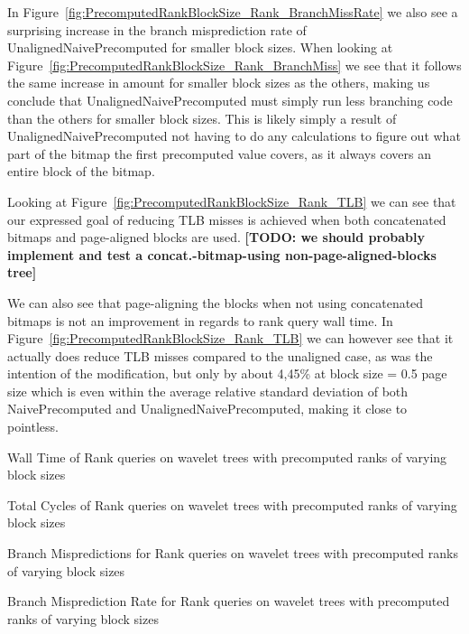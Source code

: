 In Figure~\ref{fig:PrecomputedRankBlockSize_Rank_BranchMissRate} we also see a surprising increase in the branch misprediction rate of UnalignedNaivePrecomputed for smaller block sizes.
When looking at Figure~\ref{fig:PrecomputedRankBlockSize_Rank_BranchMiss} we see that it follows the same increase in amount for smaller block sizes as the others, making us conclude that UnalignedNaivePrecomputed must simply run less branching code than the others for smaller block sizes.
This is likely simply a result of UnalignedNaivePrecomputed not having to do any calculations to figure out what part of the bitmap the first precomputed value covers, as it always covers an entire block of the bitmap.

Looking at Figure~\ref{fig:PrecomputedRankBlockSize_Rank_TLB} we can see that our expressed goal of reducing TLB misses is achieved when both concatenated bitmaps and page-aligned blocks are used. \textbf{[TODO: we should probably implement and test a concat.-bitmap-using non-page-aligned-blocks tree]}




We can also see that page-aligning the blocks when not using concatenated bitmaps is not an improvement in regards to rank query wall time.
In Figure~\ref{fig:PrecomputedRankBlockSize_Rank_TLB} we can however see that it actually does reduce TLB misses compared to the unaligned case, as was the intention of the modification, but only by about 4,45\% at block size = 0.5 page size which is even within the average relative standard deviation of both NaivePrecomputed and UnalignedNaivePrecomputed, making it close to pointless.



\figureBegin
\caption{Wall Time of Rank queries on wavelet trees with precomputed ranks of varying block sizes}
\label{fig:PrecomputedRankBlockSize_Rank_WallTime}

\figureEnd


\figureBegin
\caption{Total Cycles of Rank queries on wavelet trees with precomputed ranks of varying block sizes}
\label{fig:PrecomputedRankBlockSize_Rank_TotalCycles}

\figureEnd

\figureBegin
\caption{Branch Mispredictions for Rank queries on wavelet trees with precomputed ranks of varying block sizes}
\label{fig:PrecomputedRankBlockSize_Rank_BranchMiss}

\figureEnd


\figureBegin
\caption{Branch Misprediction Rate for Rank queries on wavelet trees with precomputed ranks of varying block sizes}
\label{fig:PrecomputedRankBlockSize_Rank_BranchMissRate}

\figureEnd


